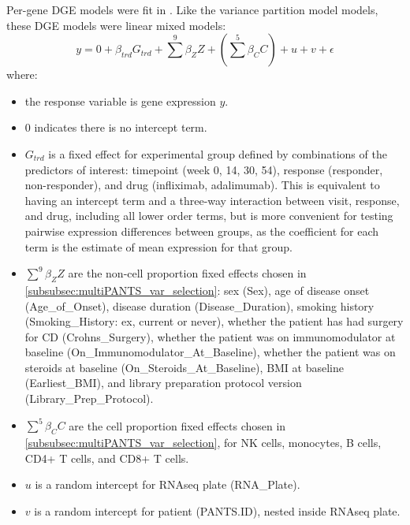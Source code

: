 Per-gene \gls{DGE} models were fit in  \autocite{hoffman2020DreamPowerfulDifferential}.
Like the variance partition model models, these \gls{DGE} models were linear mixed models:
%
%
\begin{equation}
y = 0 + \beta_{trd} G_{trd} + \sum_{}^{9}{\beta_Z Z} + (\sum_{}^{5}{\beta_C C}) + u + v + \epsilon
\label{eq:multiPANTS_dge_model}
\end{equation}
where:
\begin{itemize}
    \item the response variable is gene expression $y$.
    \item 0 indicates there is no intercept term.
    \item $G_{trd}$ is a fixed effect for experimental group defined by combinations of the predictors of interest:
        timepoint (week 0, 14, 30, 54), 
        response (responder, non-responder), 
        and drug (infliximab, adalimumab).
        This is equivalent to having an intercept term and a three-way interaction between visit, response, and drug, including all lower order terms,
        but is more convenient for testing pairwise expression differences between groups,
        as the coefficient for each term is the estimate of mean expression for that group.
    \item $\sum_{}^{9}{\beta_Z Z}$ are the non-cell proportion fixed effects chosen in \cref{subsubsec:multiPANTS_var_selection}:
        sex (Sex), 
        age of disease onset (Age\_of\_Onset), disease duration (Disease\_Duration), 
        smoking history (Smoking\_History: ex, current or never), 
        whether the patient has had surgery for \gls{CD} (Crohns\_Surgery), 
        whether the patient was on immunomodulator at baseline (On\_Immunomodulator\_At\_Baseline), 
        whether the patient was on steroids at baseline (On\_Steroids\_At\_Baseline), 
        \gls{BMI} at baseline (Earliest\_BMI),
        and library preparation protocol version (Library\_Prep\_Protocol).
    \item $\sum_{}^{5}{\beta_C C}$ are the cell proportion fixed effects chosen in \cref{subsubsec:multiPANTS_var_selection},
        for \gls{NK} cells, monocytes, B cells, CD4+ T cells, and CD8+ T cells.
    \item $u$ is a random intercept for \gls{RNAseq} plate (RNA\_Plate).
    \item $v$ is a random intercept for patient (PANTS.ID), nested inside \gls{RNAseq} plate.
\end{itemize}

